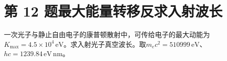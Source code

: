 \documentclass[UTF8,fontset=fandol,a4paper,11pt]{ctexart}
\begin{document}


\section*{第 12 题\quad 最大能量转移反求入射波长}\label{q:12}

一次光子与静止自由电子的康普顿散射中，可传给电子的最大动能为$K_{\max}=4.5\times10^4\,\mathrm{eV}$。求入射光子真空波长。取$m_ec^2=510999\,\mathrm{eV}$、$hc=1239.84\,\mathrm{eV\,nm}$。

\begin{center}\begin{minipage}{.98\linewidth}\centering
\begin{tikzpicture}[scale=.9,transform shape]

\end{tikzpicture}
\end{minipage}
\end{center}
\end{document}
